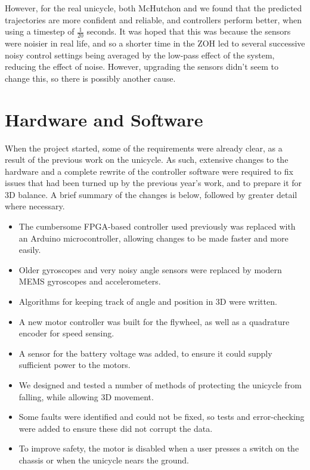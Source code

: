 \documentclass{IIBproject}
\begin{document}
However, for the real unicycle, both McHutchon and we found that the predicted
trajectories are more confident and reliable, and controllers perform better,
when using a timestep of $\frac{1}{20}$ seconds. It was hoped that this was
because the sensors were noisier in real life, and so a shorter time in the
ZOH led to several successive noisy control settings being averaged by the
low-pass effect of the system, reducing the effect of noise. However,
upgrading the sensors didn't seem to change this, so there is possibly another
cause.

\section{Hardware and Software}

When the project started, some of the requirements were already clear, as a
result of the previous work on the unicycle. As such, extensive changes to the
hardware and a complete rewrite of the controller software were required to
fix issues that had been turned up by the previous year's work, and to prepare
it for 3D balance. A brief summary of the changes is below, followed by
greater detail where necessary.

\begin{itemize}

  \item The cumbersome FPGA-based controller used previously was replaced with
    an Arduino microcontroller, allowing changes to be made faster and more
    easily.

  \item Older gyroscopes and very noisy angle sensors were replaced by modern
    MEMS gyroscopes and accelerometers.

  \item Algorithms for keeping track of angle and position in 3D were written.

  \item A new motor controller was built for the flywheel, as well as a
    quadrature encoder for speed sensing.

  \item A sensor for the battery voltage was added, to ensure it could supply
    sufficient power to the motors.

  \item We designed and tested a number of methods of protecting the unicycle
    from falling, while allowing 3D movement.

  \item Some faults were identified and could not be fixed, so tests and
    error-checking were added to ensure these did not corrupt the data.

  \item To improve safety, the motor is disabled when a user presses a switch
    on the chassis or when the unicycle nears the ground.

\end{itemize}
\end{document}
